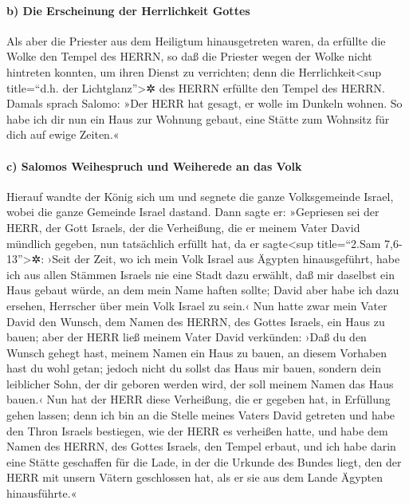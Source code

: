 \hypertarget{b-die-erscheinung-der-herrlichkeit-gottes}{%
\paragraph{b) Die Erscheinung der Herrlichkeit
Gottes}\label{b-die-erscheinung-der-herrlichkeit-gottes}}

Als aber die Priester aus dem Heiligtum hinausgetreten
waren, da erfüllte die Wolke den Tempel des HERRN, so daß
die Priester wegen der Wolke nicht hintreten konnten, um ihren Dienst zu
verrichten; denn die Herrlichkeit\textless sup title=``d.h. der
Lichtglanz''\textgreater✲ des HERRN erfüllte den Tempel des HERRN.
Damals sprach Salomo: »Der HERR hat gesagt, er wolle im
Dunkeln wohnen. So habe ich dir nun ein Haus zur Wohnung
gebaut, eine Stätte zum Wohnsitz für dich auf ewige Zeiten.«

\hypertarget{c-salomos-weihespruch-und-weiherede-an-das-volk}{%
\paragraph{c) Salomos Weihespruch und Weiherede an das
Volk}\label{c-salomos-weihespruch-und-weiherede-an-das-volk}}

Hierauf wandte der König sich um und segnete die ganze
Volksgemeinde Israel, wobei die ganze Gemeinde Israel dastand.
Dann sagte er: »Gepriesen sei der HERR, der Gott Israels,
der die Verheißung, die er meinem Vater David mündlich gegeben, nun
tatsächlich erfüllt hat, da er sagte\textless sup title=``2.Sam
7,6-13''\textgreater✲: ›Seit der Zeit, wo ich mein Volk
Israel aus Ägypten hinausgeführt, habe ich aus allen Stämmen Israels nie
eine Stadt dazu erwählt, daß mir daselbst ein Haus gebaut würde, an dem
mein Name haften sollte; David aber habe ich dazu ersehen, Herrscher
über mein Volk Israel zu sein.‹ Nun hatte zwar mein Vater
David den Wunsch, dem Namen des HERRN, des Gottes Israels, ein Haus zu
bauen; aber der HERR ließ meinem Vater David verkünden:
›Daß du den Wunsch gehegt hast, meinem Namen ein Haus zu bauen, an
diesem Vorhaben hast du wohl getan; jedoch nicht du
sollst das Haus mir bauen, sondern dein leiblicher Sohn, der dir geboren
werden wird, der soll meinem Namen das Haus bauen.‹ Nun
hat der HERR diese Verheißung, die er gegeben hat, in Erfüllung gehen
lassen; denn ich bin an die Stelle meines Vaters David getreten und habe
den Thron Israels bestiegen, wie der HERR es verheißen hatte, und habe
dem Namen des HERRN, des Gottes Israels, den Tempel erbaut,
und ich habe darin eine Stätte geschaffen für die Lade,
in der die Urkunde des Bundes liegt, den der HERR mit unsern Vätern
geschlossen hat, als er sie aus dem Lande Ägypten hinausführte.«


